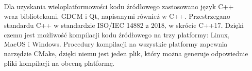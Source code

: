 \par
Dla uzyskania wieloplatformowości kodu źródłowego zastosowano język C++ wraz bibliotekami, GDCM i Qt, napisanymi również w C++.
Przestrzegano standardu C++ w standardzie ISO/IEC 14882 z 2018, w skrócie C++17.
Dzięki czemu jest możliwość kompilacji kodu źródłowego na trzy platformy: Linux, MacOS i Windows.
Procedury kompilacji na wszystkie platformy zapewnia narzędzie CMake, dzięki niemu jest jeden plik, który można generuje odpowiednie pliki kompilacji na obecną platformę.
